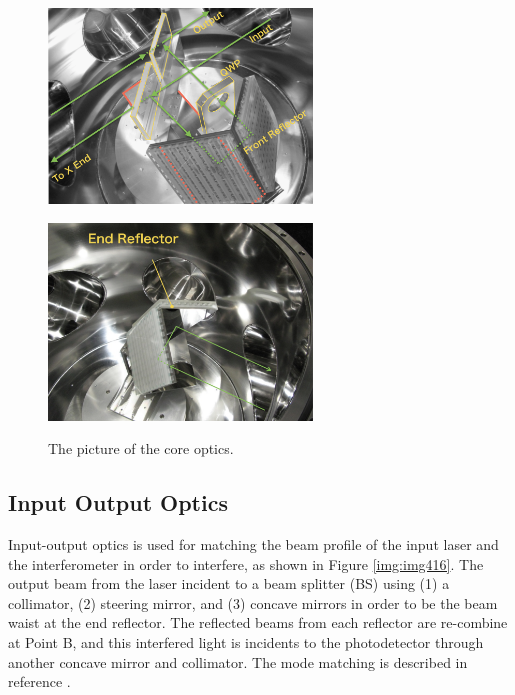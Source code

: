 \begin{figure}[p]
  \begin{minipage}[b]{0.5\hsize}
    \begin{center}   
      \includegraphics[width=7cm]{./img_chap4/img418.png} %
      \label{img:img418}
    \end{center}
  \end{minipage}\hspace{0.1cm}
  \begin{minipage}[b]{0.5\hsize}
    \begin{center}   
      \includegraphics[width=7cm]{./img_chap4/img419.png} %
      \label{img:img419}
    \end{center}
  \end{minipage}
  \caption{The picture of the core optics.}  
\end{figure}


\subsection{Input Output Optics}
Input-output optics is used for matching the beam profile of the input laser and the interferometer in order to interfere, as shown in Figure  \ref{img:img416}. The output beam from the laser incident to a beam splitter (BS) using (1) a collimator, (2) steering mirror, and (3) concave mirrors in order to be the beam waist at the end reflector. The reflected beams from each reflector are re-combine at Point B, and this interfered light is incidents to the photodetector through another concave mirror and collimator. The mode matching is described in reference \cite{miyo2017baseline}.


